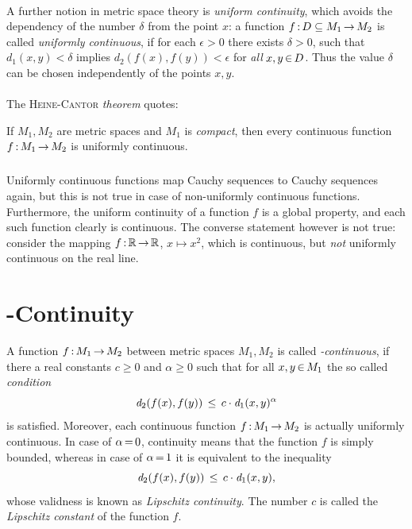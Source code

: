 \documentclass[11pt,twoside]{article}
\begin{document}
\paragraph{} %
A further notion in metric space theory is \textit{uniform continuity},
which avoids the dependency of the number $\delta$ from the point $x$:
a function $f {\,:\,} D \subseteq M_1 {\,\to\,} M_2$
is called \textit{uniformly continuous},
if for each $\epsilon > 0$ there exists $\delta > 0$,
such that $d_1(x,y) < \delta$ implies $d_2(f(x),f(y)) < \epsilon$
for \textit{all} $x,y {\,\in\,} D$.
Thus the value $\delta$ can be chosen independently of the points $x,y$.

\paragraph{} %
The \textsc{Heine-Cantor} \textit{theorem} quotes:

\begin{theorem}\label{HEINE_CANTOR_THEOREM}
If $M_1,M_2$ are metric spaces and $M_1$ is \textit{compact},
then every continuous function $f {\,:\,} M_1 {\,\to\,} M_2$ is uniformly continuous.
\end{theorem}

\subparagraph{}
Uniformly continuous functions map Cauchy sequences
to Cauchy sequences again,
but this is not true in case of non-uniformly continuous functions.
Furthermore,
the uniform continuity of a function $f$ is a global property,
and each such function clearly is continuous.
The converse statement however is not true:
consider the mapping $f {\,:\,} {\mathbb{R}} {\,\to\,} {\mathbb{R}}$, $x \mapsto x^2$,
which is continuous,
but \textit{not} uniformly continuous on the real line.

\section{{\HOELDER}-Continuity}                                                %
A function $f {\,:\,} M_1 {\,\to\,} M_2$ between metric spaces $M_1,M_2$
is called \textit{{\HOELDER}-continuous},
if there a real constants $c \geq 0$ and $\alpha \geq 0$ such that
for all $x,y {\,\in\,} M_1$ the so called \textit{{\HOELDER} condition}
\[
\mathit{d}_2(f(x),f(y)) \, \leq \, c \cdot \mathit{d}_1(x,y)^{\alpha}
\]
is satisfied.
Moreover,
each {\HOELDER} continuous function $f {\,:\,} M_1 {\,\to\,} M_2$
is actually uniformly continuous.
In case of $\alpha {\,=\,} 0$,
{\HOELDER} continuity means that the function $f$ is simply bounded,
whereas in case of $\alpha {\,=\,} 1$ it is equivalent to the inequality
\[
\mathit{d}_2(f(x),f(y)) \, \leq \, c \cdot \mathit{d}_1(x,y),
\]
whose validness is known as \textit{Lipschitz continuity}.
The number $c$ is called the \textit{Lipschitz constant} of the function $f$.
\end{document}
